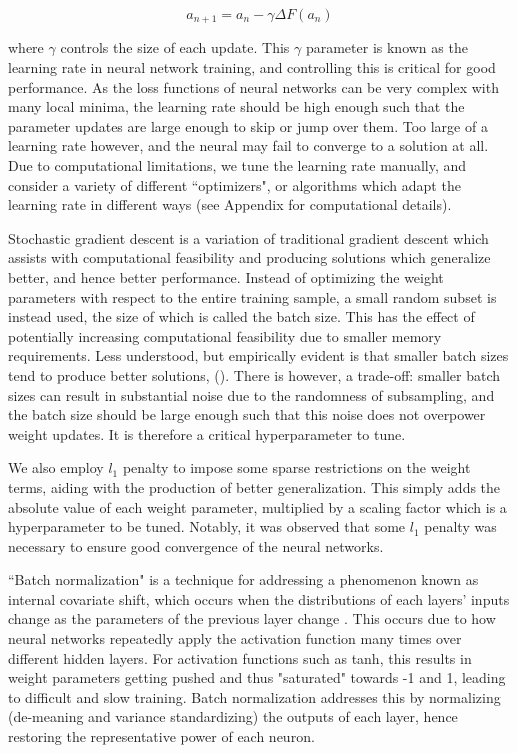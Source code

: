 \documentclass[11pt, a4paper, table]{article}
\begin{document}
\begin{equation}
	a_{n+1} = a_n - \gamma \Delta F(a_n)
\end{equation}

where $\gamma$ controls the size of each update. This $\gamma$ parameter is known as the learning rate in neural network training, and controlling this is critical for good performance. As the loss functions of neural networks can be very complex with many local minima, the learning rate should be high enough such that the parameter updates are large enough to skip or jump over them. Too large of a learning rate however, and the neural may fail to converge to a solution at all. Due to computational limitations, we tune the learning rate manually, and consider a variety of different ``optimizers", or algorithms which adapt the learning rate in different ways (see Appendix for computational details).

Stochastic gradient descent is a variation of traditional gradient descent which assists with computational feasibility and producing solutions which generalize better, and hence better performance. Instead of optimizing the weight parameters with respect to the entire training sample, a small random subset is instead used, the size of which is called the batch size. This has the effect of potentially increasing computational feasibility due to smaller memory requirements. Less understood, but empirically evident is that smaller batch sizes tend to produce better solutions, (\cite{keskar_large-batch_2016}). There is however, a trade-off: smaller batch sizes can result in substantial noise due to the randomness of subsampling, and the batch size should be large enough such that this noise does not overpower weight updates. It is therefore a critical hyperparameter to tune.

We also employ $l_1$ penalty to impose some sparse restrictions on the weight terms, aiding with the production of better generalization. This simply adds the absolute value of each weight parameter, multiplied by a scaling factor which is a hyperparameter to be tuned. Notably, it was observed that some $l_1$ penalty was necessary to ensure good convergence of the neural networks.

``Batch normalization" is a technique for addressing a phenomenon known as internal covariate shift, which occurs when the distributions of each layers' inputs change as the parameters of the previous layer change \citep{ioffe_batch_2015}. This occurs due to how neural networks repeatedly apply the activation function many times over different hidden layers. For activation functions such as tanh, this results in weight parameters getting pushed and thus "saturated" towards -1 and 1, leading to difficult and slow training. Batch normalization addresses this by normalizing (de-meaning and variance standardizing) the outputs of each layer, hence restoring the representative power of each neuron.
\end{document}

